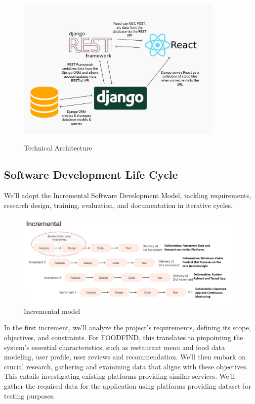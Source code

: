 \documentclass[12pt, a4paper, oneside]{article}
\begin{document}
\begin{figure}[h]
	\includegraphics[width=0.9\textwidth]{techdesc}
	\centering
	\caption{Technical Architecture }
	\label{fig:techdesc}
 \cite{garner2021}
\end{figure}
\pagebreak


\subsection{Software Development Life Cycle}
We’ll adopt the Incremental Software Development Model, tackling requirements, research design, training, evaluation, and documentation in iterative cycles.

\begin{figure}[h]
	\includegraphics[width=\linewidth]{iteration}
	\centering
	\caption{Incremental model}
	\label{fig:iteration}
\end{figure}

In the first increment, we’ll analyze the project’s requirements, defining its scope, objectives, and constraints. For FOODFIND, this translates to pinpointing the system’s essential characteristics, such as restaurant menu and food data modeling, user profile, user reviews and recommendation. We’ll then embark on crucial research, gathering and examining data that aligns with these objectives. This entails investigating existing platforms providing similar services. We’ll gather the required data for the application using platforms providing dataset for testing purposes.
\end{document}
